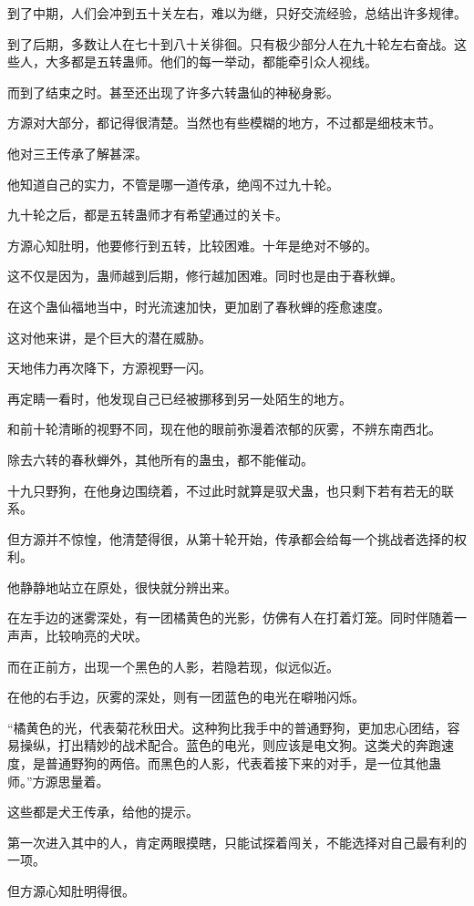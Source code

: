 \begin{this_body}
到了中期，人们会冲到五十关左右，难以为继，只好交流经验，总结出许多规律。

到了后期，多数让人在七十到八十关徘徊。只有极少部分人在九十轮左右奋战。这些人，大多都是五转蛊师。他们的每一举动，都能牵引众人视线。

而到了结束之时。甚至还出现了许多六转蛊仙的神秘身影。

方源对大部分，都记得很清楚。当然也有些模糊的地方，不过都是细枝末节。

他对三王传承了解甚深。

他知道自己的实力，不管是哪一道传承，绝闯不过九十轮。

九十轮之后，都是五转蛊师才有希望通过的关卡。

方源心知肚明，他要修行到五转，比较困难。十年是绝对不够的。

这不仅是因为，蛊师越到后期，修行越加困难。同时也是由于春秋蝉。

在这个蛊仙福地当中，时光流速加快，更加剧了春秋蝉的痊愈速度。

这对他来讲，是个巨大的潜在威胁。

天地伟力再次降下，方源视野一闪。

再定睛一看时，他发现自己已经被挪移到另一处陌生的地方。

和前十轮清晰的视野不同，现在他的眼前弥漫着浓郁的灰雾，不辨东南西北。

除去六转的春秋蝉外，其他所有的蛊虫，都不能催动。

十九只野狗，在他身边围绕着，不过此时就算是驭犬蛊，也只剩下若有若无的联系。

但方源并不惊惶，他清楚得很，从第十轮开始，传承都会给每一个挑战者选择的权利。

他静静地站立在原处，很快就分辨出来。

在左手边的迷雾深处，有一团橘黄色的光影，仿佛有人在打着灯笼。同时伴随着一声声，比较响亮的犬吠。

而在正前方，出现一个黑色的人影，若隐若现，似远似近。

在他的右手边，灰雾的深处，则有一团蓝色的电光在噼啪闪烁。

“橘黄色的光，代表菊花秋田犬。这种狗比我手中的普通野狗，更加忠心团结，容易操纵，打出精妙的战术配合。蓝色的电光，则应该是电文狗。这类犬的奔跑速度，是普通野狗的两倍。而黑色的人影，代表着接下来的对手，是一位其他蛊师。”方源思量着。

这些都是犬王传承，给他的提示。

第一次进入其中的人，肯定两眼摸瞎，只能试探着闯关，不能选择对自己最有利的一项。

但方源心知肚明得很。


\end{this_body}

